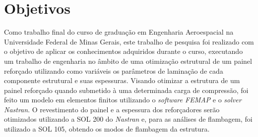 \chapter{Objetivos}

Como trabalho final do curso de graduação em Engenharia Aeroespacial na Universidade Federal de Minas Gerais, este trabalho de pesquisa foi realizado com o objetivo de aplicar os conhecimentos adquiridos durante o curso, executando um trabalho de engenharia no âmbito de uma otimização estrutural de um painel reforçado utilizando como variáveis os parâmetros de laminação de cada componente estrutural e suas espessuras.
Visando otimizar a estrutura de um painel reforçado quando submetido à uma determinada carga de compressão, foi feito um modelo em elementos finitos utilizando o \emph{software FEMAP} e o \emph{solver Nastran}. O revestimento do painel e a espessura dos reforçadores serão otimizados utilizando a SOL 200 do \emph{Nastran} e, para as análises de flambagem, foi utilizado a SOL 105, obtendo os modos de flambagem da estrutura.
